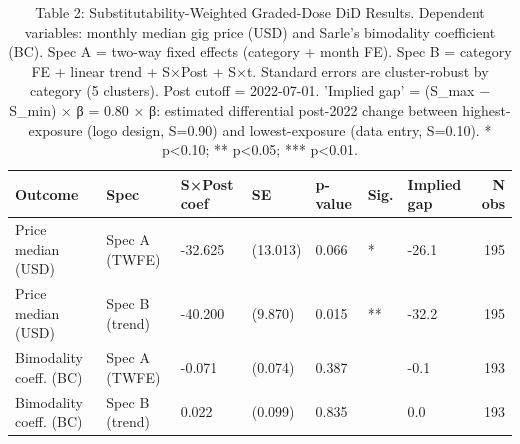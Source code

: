 \begin{table}[htbp]
\centering
\caption{Table 2: Substitutability-Weighted Graded-Dose DiD Results. Dependent variables: monthly median gig price (USD) and Sarle's bimodality coefficient (BC). Spec A = two-way fixed effects (category + month FE). Spec B = category FE + linear trend + S×Post + S×t. Standard errors are cluster-robust by category (5 clusters). Post cutoff = 2022-07-01. 'Implied gap' = (S_max − S_min) × β = 0.80 × β: estimated differential post-2022 change between highest-exposure (logo design, S=0.90) and lowest-exposure (data entry, S=0.10). * p<0.10; ** p<0.05; *** p<0.01.}
\label{tab:table2_weighted_did}
\begin{tabular}{lllllllr}
\toprule
Outcome & Spec & S×Post coef & SE & p-value & Sig. & Implied gap & N obs \\
\midrule
Price median (USD) & Spec A (TWFE) & -32.625 & (13.013) & 0.066 & * & -26.1 & 195 \\
Price median (USD) & Spec B (trend) & -40.200 & (9.870) & 0.015 & ** & -32.2 & 195 \\
Bimodality coeff. (BC) & Spec A (TWFE) & -0.071 & (0.074) & 0.387 &  & -0.1 & 193 \\
Bimodality coeff. (BC) & Spec B (trend) & 0.022 & (0.099) & 0.835 &  & 0.0 & 193 \\
\bottomrule
\end{tabular}
\end{table}
